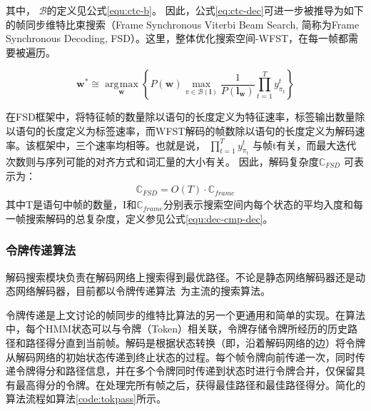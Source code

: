 其中， $\mathcal{B}$的定义见公式\ref{equ:ctc-b}。
因此，公式\ref{eq:ctc-dec}可进一步被推导为如下的帧同步维特比束搜索（Frame Synchronous Viterbi Beam Search, 简称为Frame Synchronous Decoding, FSD）。这里，整体优化搜索空间-WFST，在每一帧都需要被遍历。

              
    \begin{equation} \label{eq:viterbi-app}
       \mathbf{w}^* \cong\mathop{\arg\!\max}\limits_\mathbf{w}
       \left\{\!
       P(\mathbf{w})
       \mathop{\max}\limits
       _{\!\!\pi\in\mathcal{B}(\mathbf{l})}
       \frac{1}{P(\mathbf{l}_\mathbf{w})}
       \prod_{t=1}^{T}{y^{t}_{\pi_{t}}}
      \right \}
    \end{equation}

  
在FSD框架中，将特征帧的数量除以语句的长度定义为特征速率，标签输出数量除以语句的长度定义为标签速率，而WFST解码的帧数除以语句的长度定义为解码速率。该框架中，三个速率均相等。也就是说， $\prod_{t=1}^{T} y^{t}_{\pi_{t}}$  与帧t有关，而最大迭代次数则与序列可能的对齐方式和词汇量的大小有关。 因此，解码复杂度$\mathbb{C}_{FSD}$ 可表示为：
  \begin{equation}
\label{equ:complex-fsd}
\begin{split}
\mathbb{C}_{FSD} =  O(T) \cdot \mathbb{C}_{frame}
\end{split}
\end{equation}
其中T是语句中帧的数量，I和$\mathbb{C}_{frame}$分别表示搜索空间内每个状态的平均入度和每一帧搜索解码的总复杂度，定义参见公式\ref{equ:dec-cmp-dec}。

\subsubsection{令牌传递算法}

解码搜索模块负责在解码网络上搜索得到最优路径。不论是静态网络解码器还是动态网络解码器，目前都以令牌传递算法~\cite{young1989token}为主流的搜索算法。

令牌传递是上文讨论的帧同步的维特比算法的另一个更通用和简单的实现。在算法中，每个HMM状态可以与令牌（Token）相关联，令牌存储令牌所经历的历史路径和路径得分直到当前帧。解码是根据状态转换（即，沿着解码网络的边）将令牌从解码网络的初始状态传递到终止状态的过程。每个帧令牌向前传递一次，同时传递令牌得分和路径信息，并在多个令牌同时传递到状态时进行令牌合并，仅保留具有最高得分的令牌。在处理完所有帧之后，获得最佳路径和最佳路径得分。简化的算法流程如算法\ref{code:tokpass}所示。


